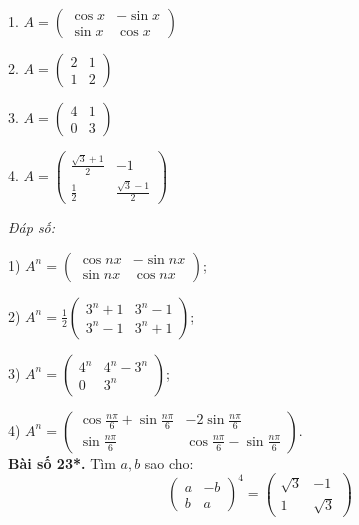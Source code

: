         1.
        \(
        A = \begin{pmatrix}
        \cos x & -\sin x \\
        \sin x & \cos x
        \end{pmatrix}
        \)
        
        2.
        \(
        A = \begin{pmatrix}
        2 & 1 \\
        1 & 2
        \end{pmatrix}
        \)
        
        3.
        \(
        A = \begin{pmatrix}
        4 & 1 \\
        0 & 3
        \end{pmatrix}
        \)
        
        4.
        \(
        A = \begin{pmatrix}
        \frac{\sqrt{3} + 1}{2} & -1 \\
        \frac{1}{2} & \frac{\sqrt{3} - 1}{2}
        \end{pmatrix}
        \)
        
        \textit{Đáp số:}

        1) \(A^n = \begin{pmatrix}
        \cos nx & -\sin nx \\
        \sin nx & \cos nx
        \end{pmatrix}\);
        
        2) \(A^n = \frac{1}{2} \begin{pmatrix}
        3^n + 1 & 3^n - 1 \\
        3^n - 1 & 3^n + 1
        \end{pmatrix}\);
        
        3) \(A^n = \begin{pmatrix}
        4^n & 4^n - 3^n \\
        0 & 3^n
        \end{pmatrix}\);
        
        4) \(A^n = \begin{pmatrix}
        \cos \frac{n\pi}{6} + \sin \frac{n\pi}{6} & -2\sin \frac{n\pi}{6} \\
        \sin \frac{n\pi}{6} & \cos \frac{n\pi}{6} - \sin \frac{n\pi}{6}
        \end{pmatrix}\).\\
\textbf{Bài số 23*.} Tìm \(a, b\) sao cho:
        \[
        \begin{pmatrix}
        a & -b \\
        b & a
        \end{pmatrix}^4 = \begin{pmatrix}
        \sqrt{3} & -1 \\
        1 & \sqrt{3}
        \end{pmatrix}
        \]
        
